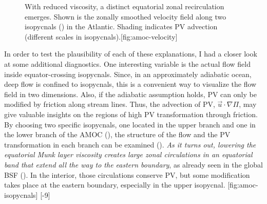 \begin{figure}
	\begin{sidecaption}{With reduced viscosity, a distinct equatorial zonal recirculation emerges. Shown is the zonally smoothed velocity field along two isopycnals (\cf {}) in the Atlantic. Shading indicates \ac{PV} advection (different scales in isopycnals).}[fig:amoc-velocity]
	\antimpjustification
	\end{sidecaption}
\end{figure}

In order to test the plausibility of each of these explanations, I had a closer look at some additional diagnostics. One interesting variable is the actual flow field inside equator-crossing isopycnals. Since, in an approximately adiabatic ocean, deep flow is 
confined to isopycnals, this is a convenient way to visualize the flow field in two dimensions. Also, if the adiabatic assumption holds, \ac{PV} can only be modified by friction along stream lines. Thus, the advection of \ac{PV}, \( \vec{u}\cdot\nabla\Pi \), may give valuable insights on the regions of high \ac{PV} transformation through friction. By choosing two specific isopycnals, one located in the upper branch and one in the lower branch of the \ac{AMOC} (), the structure of the flow and the \ac{PV} transformation in each branch can be examined (). \emph{As it turns out, lowering the equatorial Munk layer viscosity creates large zonal circulations in an equatorial band that extend all the way to the eastern boundary}, as already seen in the global \ac{BSF} (). In the interior, those circulations conserve \ac{PV}, but some modification takes place at the eastern boundary, especially in the upper isopycnal.
%
[fig:amoc-isopycnals]%
{}[-9]%

